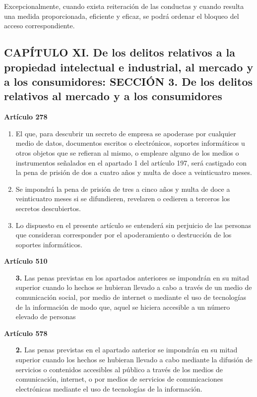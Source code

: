 Excepcionalmente, cuando exista reiteración de las conductas y cuando resulta una medida proporcionada, eficiente y eficaz, se podrá ordenar el bloqueo del acceso correspondiente.


\subsection{CAPÍTULO XI. De los delitos relativos a la propiedad intelectual e industrial, al mercado y a los consumidores: SECCIÓN 3. De los delitos relativos al mercado y a los consumidores}

\textbf{Artículo 278}
\begin{enumerate}[label=\textbf{\arabic*.}]
    \item El que, para descubrir un secreto de empresa se apoderase por cualquier medio de datos, documentos escritos o electrónicos, soportes informáticos u otros objetos que se refieran al mismo, o empleare alguno de los medios o instrumentos señalados en el apartado 1 del artículo 197, será castigado con la pena de prisión de dos a cuatro años y multa de doce a veinticuatro meses.
    \item Se impondrá la pena de prisión de tres a cinco años y multa de doce a veinticuatro meses si se difundieren, revelaren o cedieren a terceros los secretos descubiertos.
    \item Lo dispuesto en el presente artículo se entenderá sin perjuicio de las personas que consideran corresponder por el apoderamiento o destrucción de los soportes informáticos.
\end{enumerate}

\textbf{Artículo 510}
\begin{itemize}
    \item[\textbf{3.}] Las penas previstas en los apartados anteriores se impondrán en su mitad superior cuando lo hechos se hubieran llevado a cabo a través de un medio de comunicación social, por medio  de internet o mediante el uso de tecnologías de la información de modo que, aquel se hiciera accesible a un número elevado de personas
\end{itemize}

\textbf{Artículo 578}
\begin{itemize}
    \item[\textbf{2.}] Las penas previstas en el apartado anterior se impondrán en su mitad superior cuando los hechos se hubieran llevado a cabo mediante la difusión de servicios o contenidos accesibles al público a través de los medios de comunicación, internet, o por medios de servicios de comunicaciones electrónicas mediante el uso de tecnologías de la información.
\end{itemize}


